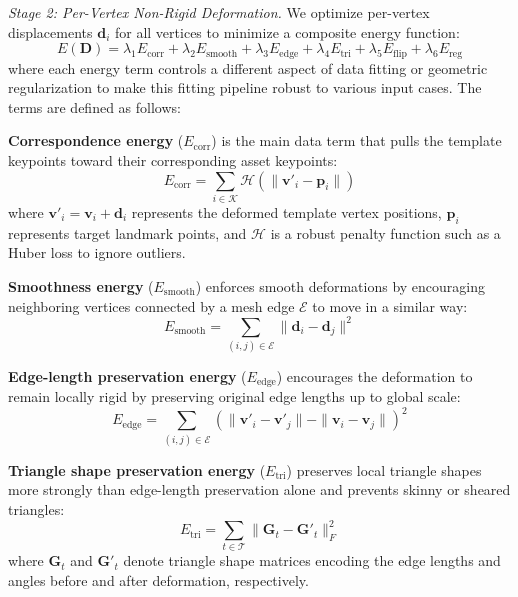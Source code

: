 \documentclass[acmtog,anonymous,review]{acmart}
\begin{document}
\emph{Stage 2: Per-Vertex Non-Rigid Deformation.} We optimize per-vertex displacements $\mathbf{d}_i$ for all vertices to minimize a composite energy function:
\begin{equation}
  E(\mathbf{D}) = \lambda_1 E_{\text{corr}} + \lambda_2 E_{\text{smooth}} + \lambda_3 E_{\text{edge}} + \lambda_4 E_{\text{tri}} + \lambda_5 E_{\text{flip}} + \lambda_6 E_{\text{reg}}
\end{equation}
where each energy term controls a different aspect of data fitting or geometric regularization to make this fitting pipeline robust to various input cases. The terms are defined as follows:

\textbf{Correspondence energy} ($E_{\text{corr}}$) is the main data term that pulls the template keypoints toward their corresponding asset keypoints:
\begin{equation}
  E_{\text{corr}} = \sum_{i \in \mathcal{K}} \mathcal{H}(\| \mathbf{v}'_i - \mathbf{p}_i \|)
\end{equation}
where $\mathbf{v}'_i = \mathbf{v}_i + \mathbf{d}_i$ represents the deformed template vertex positions, $\mathbf{p}_i$ represents target landmark points, and $\mathcal{H}$ is a robust penalty function such as a Huber loss to ignore outliers.

\textbf{Smoothness energy} ($E_{\text{smooth}}$) enforces smooth deformations by encouraging neighboring vertices connected by a mesh edge $\mathcal{E}$ to move in a similar way:
\begin{equation}
  E_{\text{smooth}} = \sum_{(i,j) \in \mathcal{E}} \| \mathbf{d}_i - \mathbf{d}_j \|^2
\end{equation}

\textbf{Edge-length preservation energy} ($E_{\text{edge}}$) encourages the deformation to remain locally rigid by preserving original edge lengths up to global scale:
\begin{equation}
  E_{\text{edge}} = \sum_{(i,j) \in \mathcal{E}} \left( \| \mathbf{v}'_i - \mathbf{v}'_j \| - \| \mathbf{v}_i - \mathbf{v}_j \| \right)^2
\end{equation}

\textbf{Triangle shape preservation energy} ($E_{\text{tri}}$) preserves local triangle shapes more strongly than edge-length preservation alone and prevents skinny or sheared triangles:
\begin{equation}
  E_{\text{tri}} = \sum_{t \in \mathcal{T}} \| \mathbf{G}_t - \mathbf{G}'_t \|_F^2
\end{equation}
where $\mathbf{G}_t$ and $\mathbf{G}'_t$ denote triangle shape matrices encoding the edge lengths and angles before and after deformation, respectively.
\end{document}
